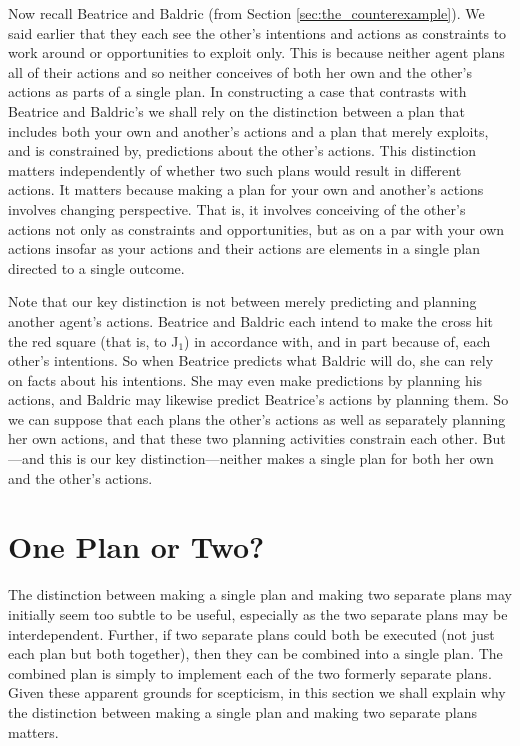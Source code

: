 \documentclass[12pt,\papersize]{extarticle}
\begin{document}
Now recall Beatrice and Baldric (from Section \vref{sec:the_counterexample}).
We said earlier that  they each see the other's intentions and actions  as constraints to work around or opportunities to exploit only.
This is because neither agent plans all of their actions and so neither conceives of both her own and the other's actions as parts of a single plan.
In constructing a case that contrasts with Beatrice and Baldric's we shall rely on the distinction between
a plan that includes both your own and another's actions
and 
a plan that merely exploits, and is constrained by, predictions about the other's actions.
This distinction matters independently of whether two such plans would result in different actions.
It matters because 
making a plan for your own and another's actions 
	involves changing perspective.
That is, it involves conceiving of the other's actions not only as constraints and opportunities, but as on a par with your own actions insofar as your actions and their actions are elements in a single plan directed to a single outcome.

Note that our key distinction is not between merely predicting and planning another agent's actions.
Beatrice and Baldric each intend to make the cross hit the red square (that is, to J${_1}$) in accordance with, and in part because of, each other's intentions.
So when Beatrice predicts what Baldric will do, she can rely on facts about his intentions.
She may even make predictions by planning his actions,
and Baldric may likewise predict Beatrice's actions by planning them.
So we can suppose that each plans the other's actions as well as separately planning her own actions,
and that these two planning activities constrain each other.
But---and this is our key distinction---neither makes a single plan for both her own and the other's actions.



\section{One Plan or Two?}
The distinction between making a single plan and making two separate plans may initially seem too subtle to be useful, 
especially as 
the two separate plans may be interdependent.
Further, if two separate plans could both be executed (not just each plan but both together), then they can be combined into a single plan.
The combined plan is simply to implement each of the two formerly separate plans. 
Given these apparent grounds for scepticism,
in this section we shall explain why the distinction between making a single plan and making two separate plans matters.
\end{document}
